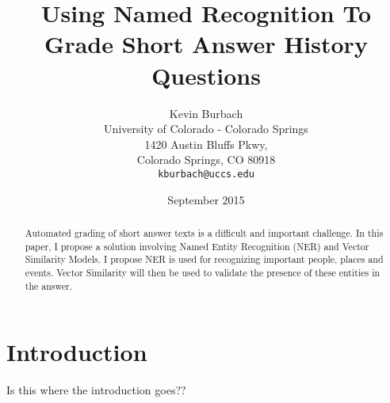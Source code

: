 \documentclass{sig-alternate}
\begin{document}
\title{Using Named Recognition To Grade Short Answer History Questions}
\author{Kevin Burbach\\
        University of Colorado - Colorado Springs\\
        1420 Austin Bluffs Pkwy,\\
        Colorado Springs, CO 80918\\
        \texttt{kburbach@uccs.edu}
       }
\date{September 2015}

\maketitle

\begin{abstract}
   Automated grading of short answer texts is a difficult and important challenge. In this paper, I propose a solution involving Named Entity Recognition (NER) and Vector Similarity Models. I propose NER is used for recognizing important people, places and events. Vector Similarity will then be used to validate the presence of these entities in the answer.
\end{abstract}


\section{Introduction}
Is this where the introduction goes??








{}

\end{document}
